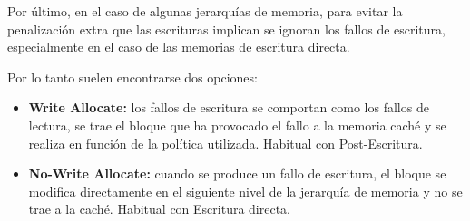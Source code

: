 Por último, en el caso de algunas jerarquías de memoria, para evitar la penalización extra que las escrituras implican se ignoran los fallos de escritura, especialmente en el caso de las memorias de escritura directa.

Por lo tanto suelen encontrarse dos opciones:

\begin{itemize}
  \item \textbf{Write Allocate:} los fallos de escritura se comportan como los fallos de lectura, se trae el bloque que ha provocado el fallo a la memoria caché y se realiza en función de la política utilizada. Habitual con Post-Escritura.
  \item \textbf{No-Write Allocate:} cuando se produce un fallo de escritura, el bloque se modifica directamente en el siguiente nivel de la jerarquía de memoria y no se trae a la caché. Habitual con Escritura directa.
\end{itemize}